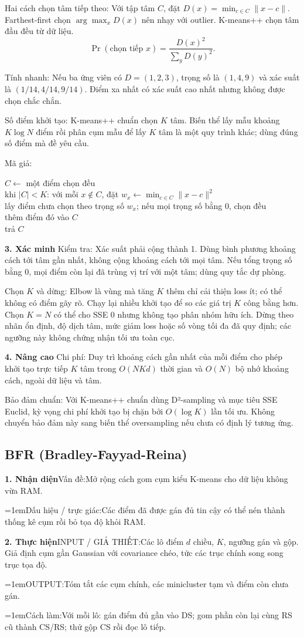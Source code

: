 \documentclass[10pt,a4paper,twocolumn]{article}
\makeatletter
\newif\ifexamheadingprinted
\newcommand{\topic}[2]{%
  \global\examheadingprintedfalse\par\subsection{#2}\label{topic:#1}}
\newcommand{\key}[1]{#1:\enspace}
\newcommand{\algfield}[2]{\par\noindent\hangindent=1em\relax#1:\enspace#2}
\newcommand{\unitheading}[2]{%
  \par\addvspace{1pt}\noindent\textbf{#1. #2}\enspace}
\newcommand{\unitverification}{\unitheading{3}{Xác minh}}
\newcommand{\unitadvanced}{\unitheading{4}{Nâng cao}}
\newcommand{\unitfield}[4]{%
  \par\noindent\textbf{#1. #2}\enspace #3:\enspace #4}
\newcommand{\algsummary}[6]{%
  \begingroup\setlength{\parskip}{1pt}%
  \unitfield{1}{Nhận diện}{Vấn đề}{#1}%
  \algfield{Dấu hiệu / trực giác}{#2}%
  \if\relax\detokenize{#3}\relax\else\par\noindent#3\par\fi%
  \unitfield{2}{Thực hiện}{INPUT / GIẢ THIẾT}{#4}%
  \algfield{OUTPUT}{#5}%
  \algfield{Cách làm}{#6}\par\endgroup}
\newenvironment{algpseudo}{%
  \par\addvspace{2pt}\noindent
  \setlength{\parskip}{0pt}%
  Mã giả:\par\nobreak
  \begin{list}{}{\setlength{\leftmargin}{1em}\setlength{\topsep}{0pt}%
    \setlength{\partopsep}{0pt}\setlength{\parsep}{0pt}%
    \@beginparpenalty=10000\relax}%
  \item\relax
}{\end{list}\par\addvspace{3pt}}
\makeatother
\begin{document}
\key{Hai cách chọn tâm tiếp theo} Với tập tâm $C$, đặt $D(x)=\min_{c\in C}\|x-c\|$. Farthest-first chọn $\arg\max_xD(x)$ nên nhạy với outlier. K-means++ chọn tâm đầu đều từ dữ liệu.
\[
\Pr(\text{chọn tiếp }x)=\frac{D(x)^2}{\sum_y D(y)^2}.
\]

\key{Tính nhanh} Nếu ba ứng viên có $D=(1,2,3)$, trọng số là $(1,4,9)$ và xác suất là $(1/14,4/14,9/14)$. Điểm xa nhất có xác suất cao nhất nhưng không được chọn chắc chắn.

\key{Số điểm khởi tạo} K-means++ chuẩn chọn $K$ tâm. Biến thể lấy mẫu khoảng $K\log N$ điểm rồi phân cụm mẫu để lấy $K$ tâm là một quy trình khác; dùng đúng số điểm mà đề yêu cầu.

\begin{algpseudo}
$C\gets$ một điểm chọn đều\\
khi $|C|<K$: với mỗi $x\notin C$, đặt $w_x\gets\min_{c\in C}\|x-c\|^2$\\
\quad lấy điểm chưa chọn theo trọng số $w_x$; nếu mọi trọng số bằng 0, chọn đều\\
\quad thêm điểm đó vào $C$\\
trả $C$
\end{algpseudo}

\unitverification
\key{Kiểm tra} Xác suất phải cộng thành 1. Dùng bình phương khoảng cách tới tâm gần nhất, không cộng khoảng cách tới mọi tâm. Nếu tổng trọng số bằng 0, mọi điểm còn lại đã trùng vị trí với một tâm; dùng quy tắc dự phòng.

\key{Chọn $K$ và dừng} Elbow là vùng mà tăng $K$ thêm chỉ cải thiện loss ít; có thể không có điểm gãy rõ. Chạy lại nhiều khởi tạo để so các giá trị $K$ công bằng hơn. Chọn $K=N$ có thể cho SSE 0 nhưng không tạo phân nhóm hữu ích. Dừng theo nhãn ổn định, độ dịch tâm, mức giảm loss hoặc số vòng tối đa đã quy định; các ngưỡng này không chứng nhận tối ưu toàn cục.

\unitadvanced
\key{Chi phí} Duy trì khoảng cách gần nhất của mỗi điểm cho phép khởi tạo trực tiếp $K$ tâm trong $O(NKd)$ thời gian và $O(N)$ bộ nhớ khoảng cách, ngoài dữ liệu và tâm.

\key{Bảo đảm chuẩn} Với K-means++ chuẩn dùng D²-sampling và mục tiêu SSE Euclid, kỳ vọng chi phí khởi tạo bị chặn bởi $O(\log K)$ lần tối ưu. Không chuyển bảo đảm này sang biến thể oversampling nếu chưa có định lý tương ứng.
\topic{bfr}{BFR (Bradley-Fayyad-Reina)}

\algsummary{Mở rộng cách gom cụm kiểu K-means cho dữ liệu không vừa RAM.}{Các điểm đã được gán đủ tin cậy có thể nén thành thống kê cụm rồi bỏ tọa độ khỏi RAM.}{}{Các lô điểm $d$ chiều, $K$, ngưỡng gán và gộp. Giả định cụm gần Gaussian với covariance chéo, tức các trục chính song song trục tọa độ.}{Tóm tắt các cụm chính, các minicluster tạm và điểm còn chưa gán.}{Với mỗi lô: gán điểm đủ gần vào DS; gom phần còn lại cùng RS cũ thành CS/RS; thử gộp CS rồi đọc lô tiếp.}
\end{document}
